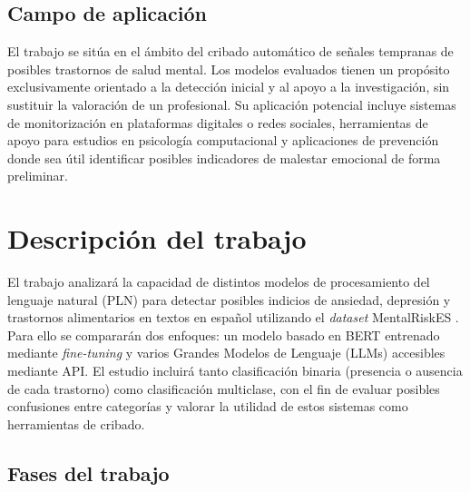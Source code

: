 \documentclass[11pt,a4paper,oneside]{article}
\begin{document}
\subsection{Campo de aplicación}

El trabajo se sitúa en el ámbito del cribado automático de señales tempranas de posibles trastornos de salud mental. Los modelos evaluados tienen un propósito exclusivamente orientado a la detección inicial y al apoyo a la investigación, sin sustituir la valoración de un profesional. Su aplicación potencial incluye sistemas de monitorización en plataformas digitales o redes sociales, herramientas de apoyo para estudios en psicología computacional y aplicaciones de prevención donde sea útil identificar posibles indicadores de malestar emocional de forma preliminar.

\section{Descripción del trabajo}
\label{sec:descr-del-trab}

El trabajo analizará la capacidad de distintos modelos de procesamiento del lenguaje natural (PLN) para detectar posibles indicios de ansiedad, depresión y trastornos alimentarios en textos en español utilizando el \textit{dataset} MentalRiskES \cite{marmolromeroMentalRiskESNewCorpus2024}. Para ello se compararán dos enfoques: un modelo basado en BERT entrenado mediante \textit{fine-tuning} y varios Grandes Modelos de Lenguaje (LLMs) accesibles mediante API. El estudio incluirá tanto clasificación binaria (presencia o ausencia de cada trastorno) como clasificación multiclase, con el fin de evaluar posibles confusiones entre categorías y valorar la utilidad de estos sistemas como herramientas de cribado.

\subsection{Fases del trabajo}
\end{document}
